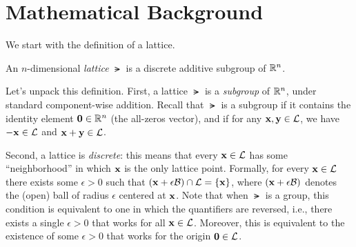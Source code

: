 \documentclass[11pt]{article}
\begin{document}
\section{Mathematical Background}
\label{sec:math-background}

We start with the definition of a lattice.

\begin{definition}
  \label{def:lattice}
  An $n$-dimensional \emph{lattice} $\lat$ is a discrete additive
  subgroup of $\mathbb{R}^{n}$.
\end{definition}

Let's unpack this definition.  First, a lattice $\lat$ is a
\emph{subgroup} of $\mathbb{R}^{n}$, under standard component-wise addition.
Recall that $\lat$ is a subgroup if it contains the identity element
$\mathbf{0} \in \mathbb{R}^{n}$ (the all-zeros vector), and if for any $\mathbf{x},
\mathbf{y} \in \mathcal{L}$, we have $-\mathbf{x} \in \mathcal{L}$ and $\mathbf{x} + \mathbf{y} \in
\mathcal{L}$.

Second, a lattice is \emph{discrete}: this means that every $\mathbf{x} \in
\mathcal{L}$ has some ``neighborhood'' in which $\mathbf{x}$ is the only lattice
point.  Formally, for every $\mathbf{x} \in \mathcal{L}$ there exists some
$\epsilon > 0$ such that $(\mathbf{x} + \epsilon \mathcal{B}) \cap \mathcal{L} =
\{\mathbf{x}\}$, where $(\mathbf{x} + \epsilon \mathcal{B})$ denotes the (open) ball
of radius $\epsilon$ centered at $\mathbf{x}$. Note that when $\lat$ is a
group, this condition is equivalent to one in which the quantifiers
are reversed, i.e., there exists a single $\epsilon > 0$ that works
for all $\mathbf{x} \in \mathcal{L}$.  Moreover, this is equivalent to the
existence of some $\epsilon > 0$ that works for the origin $\mathbf{0}
\in \mathcal{L}$.
\end{document}
